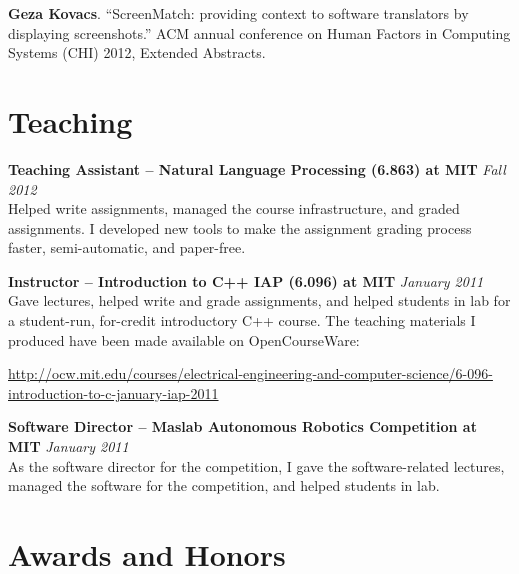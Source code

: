 \documentclass[margin,line]{resume}
\begin{document}
\begin{resume}
\textbf{Geza Kovacs}. ``ScreenMatch: providing context to software translators by displaying screenshots.'' ACM annual conference on Human Factors in Computing Systems (CHI) 2012, Extended Abstracts.%


\section{\mysidestyle Teaching}

\textbf{Teaching Assistant -- Natural Language Processing (6.863) at MIT} \hfill \textsl{Fall 2012} \\
Helped write assignments, managed the course infrastructure, and graded assignments. I developed new tools to make the assignment grading process faster, semi-automatic, and paper-free.

\textbf{Instructor -- Introduction to C++ IAP (6.096) at MIT} \hfill \textsl{January 2011}\\
Gave lectures, helped write and grade assignments, and helped students in lab for a student-run, for-credit introductory C++ course. The teaching materials I produced have been made available on OpenCourseWare:

\vspace{-4mm}

\url{http://ocw.mit.edu/courses/electrical-engineering-and-computer-science/6-096-introduction-to-c-january-iap-2011} \\

\vspace{-5mm}

\textbf{Software Director -- Maslab Autonomous Robotics Competition at MIT} \hfill \textsl{January 2011}\\
As the software director for the competition, I gave the software-related lectures,
managed the software for the competition, and helped students in lab.

\section{\mysidestyle Awards and Honors}


\end{resume}
\end{document}
